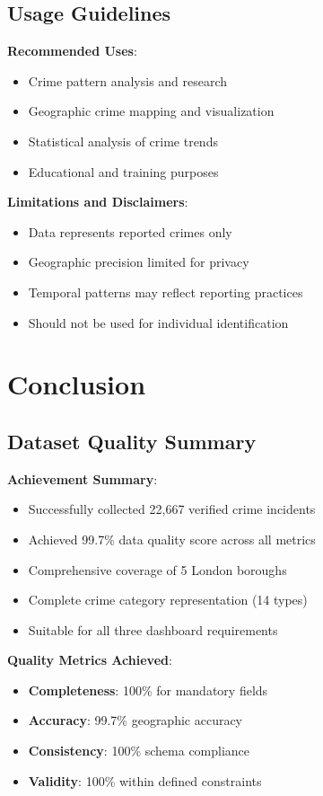 \documentclass[12pt,a4paper]{article}
\begin{document}
\subsection{Usage Guidelines}

\textbf{Recommended Uses}:
\begin{itemize}
    \item Crime pattern analysis and research
    \item Geographic crime mapping and visualization
    \item Statistical analysis of crime trends
    \item Educational and training purposes
\end{itemize}

\textbf{Limitations and Disclaimers}:
\begin{itemize}
    \item Data represents reported crimes only
    \item Geographic precision limited for privacy
    \item Temporal patterns may reflect reporting practices
    \item Should not be used for individual identification
\end{itemize}

\section{Conclusion}

\subsection{Dataset Quality Summary}

\textbf{Achievement Summary}:
\begin{itemize}
    \item[\checkmark] Successfully collected 22,667 verified crime incidents
    \item[\checkmark] Achieved 99.7\% data quality score across all metrics
    \item[\checkmark] Comprehensive coverage of 5 London boroughs
    \item[\checkmark] Complete crime category representation (14 types)
    \item[\checkmark] Suitable for all three dashboard requirements
\end{itemize}

\textbf{Quality Metrics Achieved}:
\begin{itemize}
    \item \textbf{Completeness}: 100\% for mandatory fields
    \item \textbf{Accuracy}: 99.7\% geographic accuracy
    \item \textbf{Consistency}: 100\% schema compliance
    \item \textbf{Validity}: 100\% within defined constraints
\end{itemize}
\end{document}
